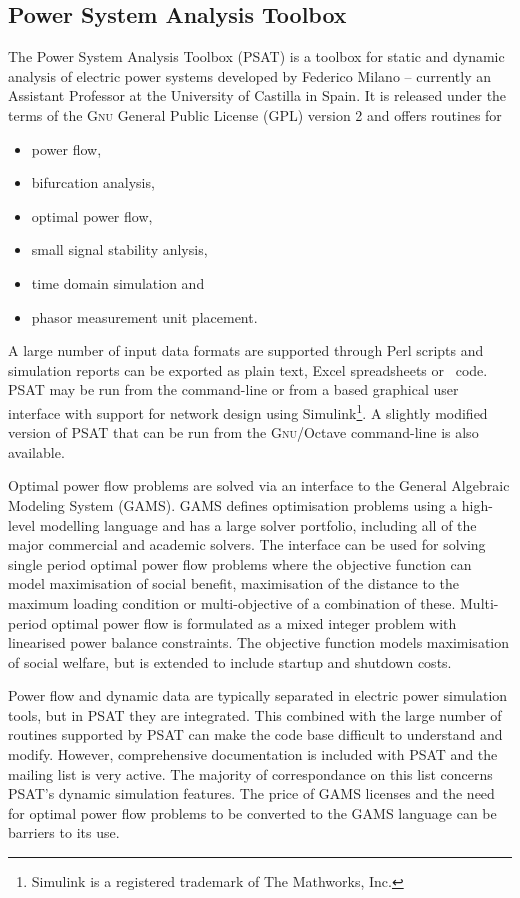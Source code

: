 \subsection{Power System Analysis Toolbox}
\label{sec:psat}
The Power System Analysis Toolbox (PSAT) is a \matlab toolbox for static and
dynamic analysis of electric power systems developed by Federico Milano
-- currently an Assistant Professor at the University of Castilla in Spain. It
is released under the terms of the \textsc{Gnu} General Public License (GPL)
version 2 and offers routines for
\begin{itemize}
	\item power flow,
	\item bifurcation analysis,
	\item optimal power flow,
	\item small signal stability anlysis,
	\item time domain simulation and
	\item phasor measurement unit placement.
\end{itemize}
A large number of input data formats are supported through Perl scripts and
simulation reports can be exported as plain text, Excel spreadsheets or
\LaTeXe~code.  PSAT may be run from the \matlab command-line or from a \matlab
based graphical user interface with support for network design using
Simulink\footnote{Simulink is a registered trademark of The Mathworks, Inc.}.
A slightly modified version of PSAT that can be run from the
\textsc{Gnu}/Octave command-line is also available.


Optimal power flow problems are solved via an interface to the General
Algebraic Modeling System (GAMS).  GAMS defines optimisation
problems using a high-level modelling language and has a large solver portfolio, including all
of the major commercial and academic solvers.  The interface can be used for
solving single period optimal power flow problems where the objective function
can model maximisation of social benefit, maximisation of the distance to
the maximum loading condition or multi-objective of a combination of these.
Multi-period optimal power flow is formulated as a mixed integer problem with
linearised power balance constraints.  The objective function models
maximisation of social welfare, but is extended to include startup and
shutdown costs.

Power flow and dynamic data are typically separated in electric power
simulation tools, but in PSAT they are integrated.  This combined with the
large number of routines supported by PSAT can make the code base difficult to
understand and modify.  However, comprehensive documentation is included with
PSAT and the mailing list is very active.  The majority of correspondance on
this list concerns PSAT's dynamic simulation features.  The price of GAMS
licenses and the need for optimal power flow problems to be converted to the
GAMS language can be barriers to its use.

